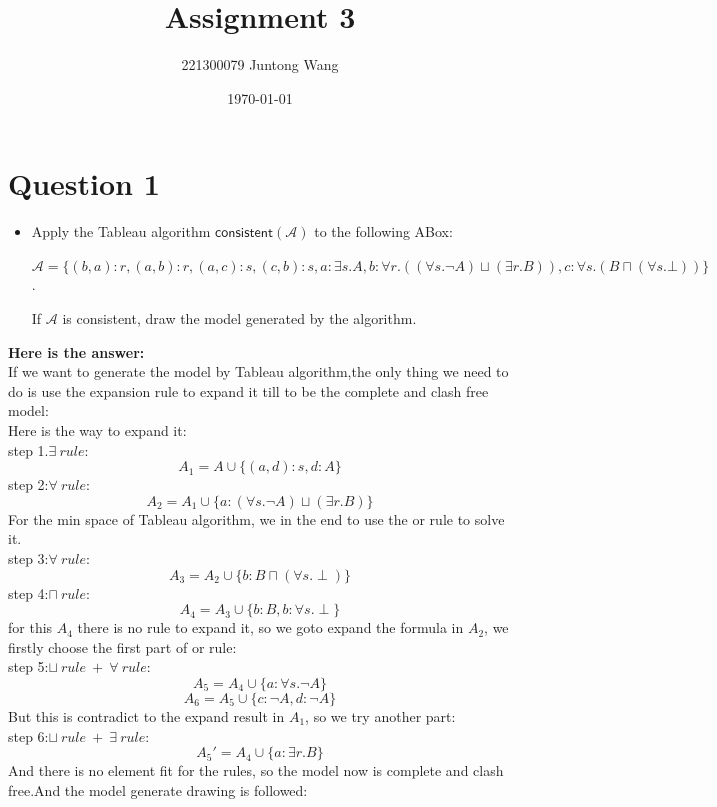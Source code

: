 \documentclass{article}
\title{Assignment 3}
\author{221300079 Juntong Wang}
\date{\today}
\begin{document}
	\maketitle

	\section{Question 1}
    \begin{itemize}
        \item Apply the Tableau algorithm $\textsf{consistent}(\mathcal{A})$ to the following ABox:
        \begin{center}
        $\mathcal{A}=\{(b,a):r, (a,b):r, (a,c):s, (c,b):s, a:\exists s.A, b:\forall r.((\forall s.\neg A)\sqcup(\exists r.B)), c:\forall s.(B\sqcap(\forall s.\bot))\}$.
        \end{center}If $\mathcal{A}$ is consistent, draw the model generated by the algorithm.
    \end{itemize}
    \textbf{Here is the answer:}\\
    If we want to generate the model by Tableau algorithm,the only thing we need to do is use the expansion rule to expand it till to be the complete and clash free model:\\
    Here is the way to expand it:\\
    step 1.$\exists \ rule$:
    \[
        A_1 = A  \cup \{(a,d) : s , d : A\}
    \]
    step 2:$\forall \ rule$:
    \[
        A_2 = A_1 \cup \{a : (\forall s.\neg A) \sqcup (\exists r .B)\}  
    \]
    For the min space of Tableau algorithm, we in the end to use the or rule to solve it.\\
    step 3:$\forall \ rule$:
    \[
        A_3 = A_2 \cup \{b : B \sqcap (\forall s .\perp )\}  
    \]
    step 4:$\sqcap \ rule$:
    \[
        A_4 = A_3 \cup \{b:B , b: \forall s. \perp\}  
    \]
    for this $A_4$ there is no rule to expand it, so we goto expand the formula in $A_2$,
    we firstly choose the first part of or rule:\\
    step 5:$\sqcup \ rule \ + \ \forall \ rule$:
    \[
        A_5 = A_4 \cup \{a: \forall s .\neg A\} 
    \]   
    \[
        A_6 = A_5 \cup \{c: \neg A,d : \neg A\}  
    \]
    But this is contradict to the expand result in $A_1$, so we try another part:\\
    step 6:$\sqcup \ rule \ + \ \exists \ rule$:
    \[
        A_5' = A_4 \cup \{a: \exists r .B\}
    \]
    And there is no element fit for the rules, so the model now is complete and clash free.And the model generate drawing is followed:\\
\end{document}
